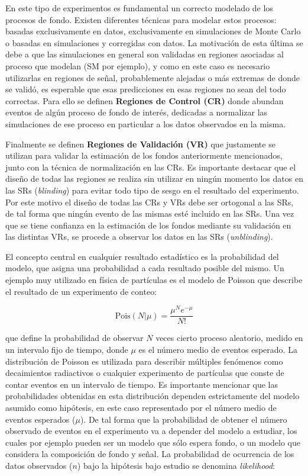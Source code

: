 En este tipo de experimentos es fundamental un correcto modelado de los procesos de fondo. Existen diferentes técnicas para modelar estos procesos: basadas exclusivamente en datos, exclusivamente en simulaciones de Monte Carlo o basadas en simulaciones y corregidas con datos. La motivación de esta última se debe a que las simulaciones en general son validadas en regiones asociadas al proceso que modelan (SM por ejemplo), y como en este caso es necesario utilizarlas en regiones de señal, probablemente alejadas o más extremas de donde se validó, es esperable que esas predicciones en esas regiones no sean del todo correctas. Para ello se definen \textbf{Regiones de Control (CR)} donde abundan eventos de algún proceso de fondo de interés, dedicadas a normalizar las simulaciones de ese proceso en particular a los datos observados en la misma.

Finalmente se definen \textbf{Regiones de Validación (VR)} que justamente se utilizan para validar la estimación de los fondos anteriormente mencionados, junto con la técnica de normalización en las CRs. Es importante destacar que el diseño de todas las regiones se realiza sin utilizar en ningún momento los datos en las SRs (\textit{blinding}) para evitar todo tipo de sesgo en el resultado del experimento. Por este motivo el diseño de todas las CRs y VRs debe ser ortogonal a las SRs, de tal forma que ningún evento de las mismas esté incluido en las SRs. Una vez que se tiene confianza en la estimación de los fondos mediante su validación en las distintas VRs, se procede a observar los datos en las SRs (\textit{unblinding}).

El concepto central en cualquier resultado estadístico es la probabilidad del modelo, que asigna una probabilidad a cada resultado posible del mismo. Un ejemplo muy utilizado en física de partículas es el modelo de Poisson que describe el resultado de un experimento de conteo:

\begin{equation}
	\text{Pois}(N|\mu) = \frac{\mu^{N}e^{-\mu}}{N!}
\end{equation}

\noindent
que define la probabilidad de observar $N$ veces cierto proceso aleatorio, medido en un intervalo fijo de tiempo, donde $\mu$ es el número medio de eventos esperado. La distribución de Poisson es utilizada para describir múltiples fenómenos como decaimientos radiactivos o cualquier experimento de partículas que conste de contar eventos en un intervalo de tiempo. Es importante mencionar que las probabilidades obtenidas en esta distribución dependen estrictamente del modelo asumido como hipótesis, en este caso representado por el número medio de eventos esperados ($\mu$). De tal forma que la probabilidad de obtener el número observado de eventos en el experimento va a depender del modelo a estudiar, los cuales por ejemplo pueden ser un modelo que sólo espera fondo, o un modelo que considera la composición de fondo y señal. La probabilidad de ocurrencia de los datos observados ($n$) bajo la hipótesis bajo estudio se denomina \textit{likelihood}:


